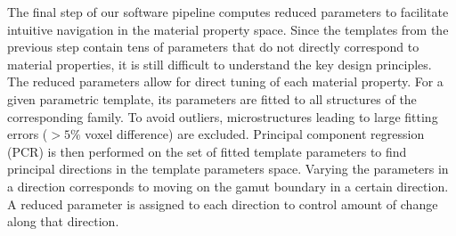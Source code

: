 The final step of our software pipeline computes reduced parameters to facilitate intuitive navigation in the material property space.
Since the templates from the previous step contain tens of parameters that do not directly correspond to material properties, it is still difficult to understand the key design principles.
The reduced parameters allow for direct tuning of each material property.
For a given parametric template, its parameters are fitted to all structures of the corresponding family.
To avoid outliers, microstructures leading to large fitting errors ($>5\%$ voxel difference) are excluded.
Principal component regression (PCR) is then performed on the set of fitted template parameters to find principal directions in the template parameters space.
Varying the parameters in a direction corresponds to moving on the gamut boundary in a certain direction. A reduced parameter is assigned to each direction to control amount of change along that direction.
